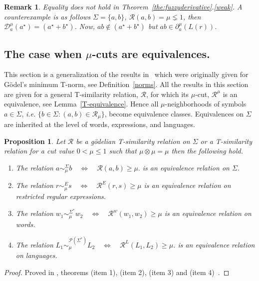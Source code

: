 \documentclass{article}
\def\ie{{\em i.e. }}
\newcommand{\cR}{{\mathcal R}}
\def\cut{\mu}
\newtheorem{proposition}{Proposition}[section]
\newtheorem{remark}{Remark}[section]
\begin{document}

\begin{remark}\label{mismatch} Equality does not hold in Theorem~\ref{the:fuzzyderivative}.\ref{weak}. A counterexample is as follows $\Sigma=\{a,b\}$, $\cR(a,b)=\mu \lneq 1$, then $\mathcal D^\mu_a(a^\star)=(a^\star+b^\star)$. Now, $ab\notin (a^\star+b^\star)$ but $ab \in \partial_a^\mu(L(r))$. 
\end{remark}


\subsection{The case when $\mu$-cuts are equivalences.}
This section is a generalization of the results in~\cite{KM26} which were originally given for G\"odel's minimum T-norm, see Definition~\ref{norms}. 
All the results in this section are given for a general T-similarity relation, $\cR$, for which its $\mu$-cut, $\cR^\mu$ is an equivalence, see Lemma~\ref{T-equivalence}. Hence all $\mu$-neighborhoods of symbols $a\in\Sigma$, \ie $\{b \in\Sigma : (a,b)\in\mathcal{R}_\cut\}$, become equivalence classes.  
Equivalences on $\Sigma$ are inherited at the level of words, expressions, and languages.

\begin{proposition}\label{prop:cut-equivalence}
Let $\cR$ be a g\"odelian T-similarity relation on $\Sigma$ or a T-similarity relation for a cut value $0 < \cut \le 1$ such that $\mu\otimes\mu=\mu$ then 
the following hold. 
\begin{enumerate}
\item The relation $
  a \sim_\cut^\Sigma b \quad\Longleftrightarrow\quad \cR(a,b)\ge \cut.
$ is an equivalence relation on $\Sigma$. 
\item The relation $
  r\sim_\cut^E s
  \quad\Longleftrightarrow\quad
  \mathcal R^E(r,s)\ge\cut
$
 is an equivalence relation on restricted regular expressions.
\item The relation $
  w_1\sim_\cut^{\Sigma^*}w_2
  \quad\Longleftrightarrow\quad
  \mathcal R^w(w_1,w_2)\ge\cut $
 is an equivalence relation on words.
\item The relation $
  L_1\sim_\cut^{\mathcal P(\Sigma^*)}L_2
  \quad\Longleftrightarrow\quad
  \mathcal R^L(L_1,L_2)\ge\cut$.
is an equivalence relation on languages. 
\end{enumerate}
\end{proposition}
\begin{proof}
\begin{sloppypar}\raggedright
Proved in , theorems
 (item 1),  (item 2),
 (item 3) and
 (item 4)~\cite{OurRocqRepo}.
\end{sloppypar}
\end{proof}
\end{document}
